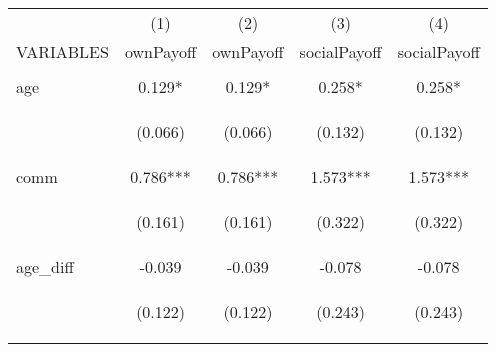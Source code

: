 \begin{center}
\begin{tabular}{lcccc} \hline
 & (1) & (2) & (3) & (4) \\
VARIABLES & ownPayoff & ownPayoff & socialPayoff & socialPayoff \\ \hline
\vspace{4pt} & \begin{footnotesize}\end{footnotesize} & \begin{footnotesize}\end{footnotesize} & \begin{footnotesize}\end{footnotesize} & \begin{footnotesize}\end{footnotesize} \\
age & 0.129* & 0.129* & 0.258* & 0.258* \\
\vspace{4pt} & \begin{footnotesize}(0.066)\end{footnotesize} & \begin{footnotesize}(0.066)\end{footnotesize} & \begin{footnotesize}(0.132)\end{footnotesize} & \begin{footnotesize}(0.132)\end{footnotesize} \\
comm & 0.786*** & 0.786*** & 1.573*** & 1.573*** \\
\vspace{4pt} & \begin{footnotesize}(0.161)\end{footnotesize} & \begin{footnotesize}(0.161)\end{footnotesize} & \begin{footnotesize}(0.322)\end{footnotesize} & \begin{footnotesize}(0.322)\end{footnotesize} \\
age\_diff & -0.039 & -0.039 & -0.078 & -0.078 \\
\vspace{4pt} & \begin{footnotesize}(0.122)\end{footnotesize} & \begin{footnotesize}(0.122)\end{footnotesize} & \begin{footnotesize}(0.243)\end{footnotesize} & \begin{footnotesize}(0.243)\end{footnotesize} \\

\end{tabular}
\end{center}
